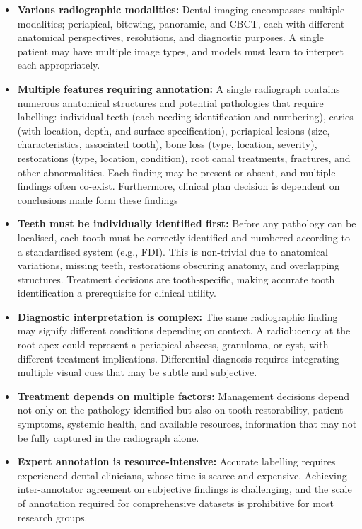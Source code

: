 \documentclass[12pt,a4paper]{report}
\begin{document}
\begin{itemize}
    \item \textbf{Various radiographic modalities:} Dental imaging encompasses multiple modalities; periapical, bitewing, panoramic, and CBCT, each with different anatomical perspectives, resolutions, and diagnostic purposes. A single patient may have multiple image types, and models must learn to interpret each appropriately.

    \item \textbf{Multiple features requiring annotation:} A single radiograph contains numerous anatomical structures and potential pathologies that require labelling: individual teeth (each needing identification and numbering), caries (with location, depth, and surface specification), periapical lesions (size, characteristics, associated tooth), bone loss (type, location, severity), restorations (type, location, condition), root canal treatments, fractures, and other abnormalities. Each finding may be present or absent, and multiple findings often co-exist. Furthermore, clinical plan decision is dependent on conclusions made form these findings

    \item \textbf{Teeth must be individually identified first:} Before any pathology can be localised, each tooth must be correctly identified and numbered according to a standardised system (e.g., FDI). This is non-trivial due to anatomical variations, missing teeth, restorations obscuring anatomy, and overlapping structures. Treatment decisions are tooth-specific, making accurate tooth identification a prerequisite for clinical utility.

    \item \textbf{Diagnostic interpretation is complex:} The same radiographic finding may signify different conditions depending on context. A radiolucency at the root apex could represent a periapical abscess, granuloma, or cyst, with different treatment implications. Differential diagnosis requires integrating multiple visual cues that may be subtle and subjective.

    \item \textbf{Treatment depends on multiple factors:} Management decisions depend not only on the pathology identified but also on tooth restorability, patient symptoms, systemic health, and available resources, information that may not be fully captured in the radiograph alone.

    \item \textbf{Expert annotation is resource-intensive:} Accurate labelling requires experienced dental clinicians, whose time is scarce and expensive. Achieving inter-annotator agreement on subjective findings is challenging, and the scale of annotation required for comprehensive datasets is prohibitive for most research groups.
\end{itemize}
\end{document}

